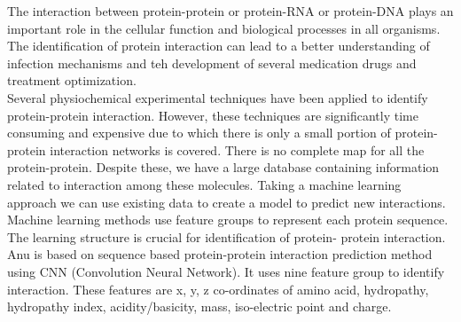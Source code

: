 \documentclass[../main.tex]{subfiles}
\begin{document}


The interaction between protein-protein or protein-RNA or protein-DNA
plays an important role in the cellular function and biological processes
in all organisms. The identification of protein interaction can lead to a
better understanding of infection mechanisms and teh development of several
medication drugs and treatment optimization. \\
Several physiochemical experimental techniques have been applied to
identify protein-protein interaction. However, these techniques are
significantly time consuming and expensive due to which there is only
a small portion of protein-protein interaction networks is covered.
There is no complete map for all the protein-protein. Despite these,
we have a large database containing information related to interaction
among these molecules. Taking a machine learning approach we can use
existing data to create a model to predict new interactions. \\
Machine learning methods use feature groups to represent each protein
sequence. The learning structure is crucial for identification of protein-
protein interaction. Anu is based on sequence based protein-protein
interaction prediction method using CNN (Convolution Neural Network).
It uses nine feature group to identify interaction. These features are
x, y, z co-ordinates of amino acid, hydropathy, hydropathy index,
acidity/basicity, mass, iso-electric point and charge.
\end{document}

